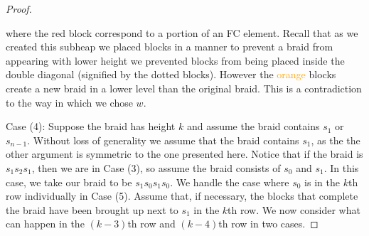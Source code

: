 \begin{theorem}
\begin{proof}
\begin{center}
	\end{center}
	where the \textcolor{rred}{red} block correspond to a portion of an FC element. Recall that as we created this subheap we placed blocks in a manner to prevent a braid from appearing with lower height we prevented blocks from being placed inside the double diagonal (signified by the dotted blocks). However the \textcolor{orange}{orange} blocks create a new braid in a lower level than the original braid. This is a contradiction to the way in which we chose $w$.  
%		
%		
%	
%		
		
	Case (4): Suppose the braid has height $k$ and assume the braid contains $s_1$ or $s_{n-1}$. Without loss of generality we assume that the braid contains $s_1$, as the the other argument is symmetric to the one presented here. Notice that if the braid is  $s_1s_2s_1$, then we are in Case (3), so assume the braid consists of $s_0$ and $s_1$. In this case, we take our braid to be $s_1s_0s_1s_0$. We handle the case where $s_0$ is in the $k$th row individually in Case (5). Assume that, if necessary, the blocks that complete the braid have been brought up next to $s_1$ in the $k$th row. We now consider what can happen in the $(k-3)$th row and $(k-4)$th row in two cases.  
	

\end{proof}
\end{theorem}
